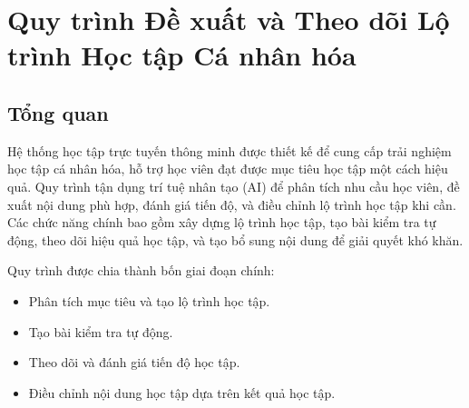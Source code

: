 

\section{Quy trình Đề xuất và Theo dõi Lộ trình Học tập Cá nhân hóa}

\subsection{Tổng quan}
Hệ thống học tập trực tuyến thông minh được thiết kế để cung cấp trải nghiệm học tập cá nhân hóa, hỗ trợ học viên đạt được mục tiêu học tập một cách hiệu quả. Quy trình tận dụng trí tuệ nhân tạo (AI) để phân tích nhu cầu học viên, đề xuất nội dung phù hợp, đánh giá tiến độ, và điều chỉnh lộ trình học tập khi cần. Các chức năng chính bao gồm xây dựng lộ trình học tập, tạo bài kiểm tra tự động, theo dõi hiệu quả học tập, và tạo bổ sung nội dung để giải quyết khó khăn.

Quy trình được chia thành bốn giai đoạn chính:
\begin{itemize}
	\item Phân tích mục tiêu và tạo lộ trình học tập.
	\item Tạo bài kiểm tra tự động.
	\item Theo dõi và đánh giá tiến độ học tập.
	\item Điều chỉnh nội dung học tập dựa trên kết quả học tập.
\end{itemize}

